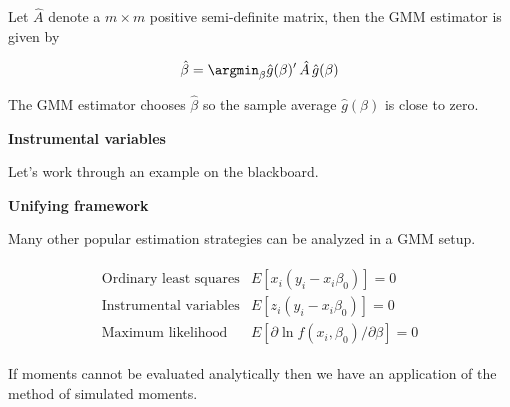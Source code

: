 \begin{frame}
Let $\hat{A}$ denote a $m \times m$ positive semi-definite matrix, then the GMM estimator is given by

\begin{align*}
\hat{\beta} = \argmin_\beta \hat{g}(\beta)^\prime\,\hat{A}\,\hat{g}(\beta)
\end{align*}

The GMM estimator chooses $\hat{\beta}$ so the sample average $\hat{g}(\beta)$ is close to zero.

\end{frame}
\begin{frame}\textbf{Instrumental variables}\vspace{1cm}

\begin{center}
Let's work through an example on the blackboard.
\end{center}

\end{frame}
\begin{frame}\textbf{Unifying framework}\vspace{1cm}

Many other popular estimation strategies can be analyzed in a GMM setup.

\begin{align*}\begin{array}{ll}
\text{Ordinary least squares} & E[x_i (y_i - x_i \beta_0)] = 0 \\
\text{Instrumental variables} & E[z_i (y_i - x_i \beta_0)] = 0 \\
\text{Maximum likelihood}     & E[\partial \ln f(x_i, \beta_0) / \partial\beta] = 0
\end{array}
\end{align*}

\end{frame}
\begin{frame}

If moments cannot be evaluated analytically then we have an application of the method of simulated moments.
\end{frame}
